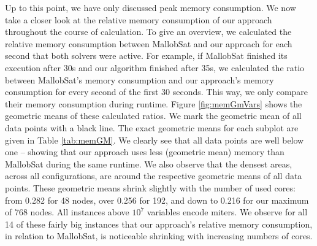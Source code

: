 \documentclass[12pt,a4paper,twoside]{scrartcl}
\numberwithin{equation}{section}
\begin{document}
\label{sec:GMs}
Up to this point, we have only discussed peak memory consumption. We now take a closer look at the relative memory consumption of our approach throughout the course of calculation. To give an overview, we calculated the relative memory consumption between MallobSat and our approach for each second that both solvers were active. For example, if MallobSat finished its execution after 30s and our algorithm finished after 35s, we calculated the ratio between MallobSat's memory consumption and our approach's memory consumption for every second of the first 30 seconds. This way, we only compare their memory consumption during runtime. Figure \ref{fig:memGmVars} shows the geometric means of these calculated ratios. We mark the geometric mean of all data points with a black line. The exact geometric means for each subplot are given in Table \ref{tab:memGM}.
We clearly see that all data points are well below one -- showing that our approach uses less (geometric mean) memory than MallobSat during the same runtime. We also observe that the densest areas, across all configurations, are around the respective geometric means of all data points. These geometric means shrink slightly with the number of used cores: from 0.282 for 48 nodes, over 0.256 for 192, and down to 0.216 for our maximum of 768 nodes. All instances above $10^7$ variables encode miters. We observe for all 14 of these fairly big instances that our approach's relative memory consumption, in relation to MallobSat, is noticeable shrinking with increasing numbers of cores.

\end{document}
